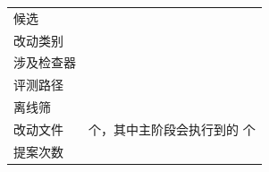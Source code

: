 \begin{frame}{\RoundTitleA{\RID}{\RNUM}}
  \begin{columns}[T,totalwidth=\textwidth]
    \begin{column}{47.5mm}
      {\scriptsize\renewcommand{\arraystretch}{1.36}%
      \begin{tabular}{@{}L{14.5mm}L{31mm}@{}}
        \toprule
        候选        & \textbf{} \\
        改动类别    & \classname{\RID} \\
        涉及检查器  &  \\
        评测路径    & \pathname{\RID} \\
        离线筛      &  \\
        改动文件    &  个，其中主阶段会执行到的  个 \\
        提案次数    &  \\
        \bottomrule
      \end{tabular}}
      \vspace{1.4mm}


\end{column}
\end{columns}
\end{frame}
